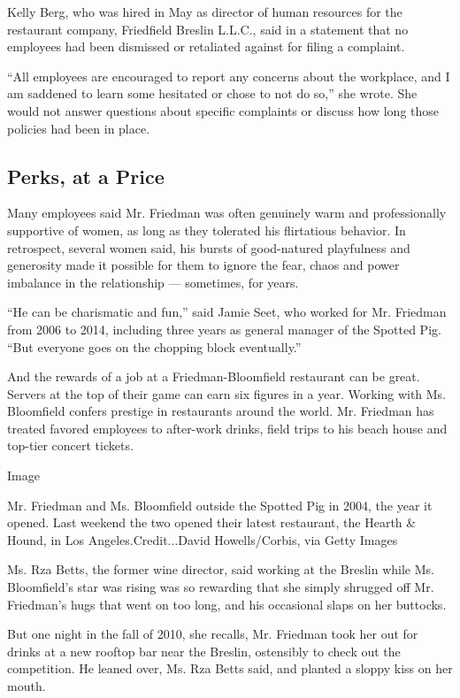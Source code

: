 Kelly Berg, who was hired in May as director of human resources for the
restaurant company, Friedfield Breslin L.L.C., said in a statement that
no employees had been dismissed or retaliated against for filing a
complaint.

``All employees are encouraged to report any concerns about the
workplace, and I am saddened to learn some hesitated or chose to not do
so,'' she wrote. She would not answer questions about specific
complaints or discuss how long those policies had been in place.

\hypertarget{perks-at-a-price}{%
\subsection{Perks, at a Price}\label{perks-at-a-price}}

Many employees said Mr. Friedman was often genuinely warm and
professionally supportive of women, as long as they tolerated his
flirtatious behavior. In retrospect, several women said, his bursts of
good-natured playfulness and generosity made it possible for them to
ignore the fear, chaos and power imbalance in the relationship ---
sometimes, for years.

``He can be charismatic and fun,'' said Jamie Seet, who worked for Mr.
Friedman from 2006 to 2014, including three years as general manager of
the Spotted Pig. ``But everyone goes on the chopping block eventually.''

And the rewards of a job at a Friedman-Bloomfield restaurant can be
great. Servers at the top of their game can earn six figures in a year.
Working with Ms. Bloomfield confers prestige in restaurants around the
world. Mr. Friedman has treated favored employees to after-work drinks,
field trips to his beach house and top-tier concert tickets.

Image

Mr. Friedman and Ms. Bloomfield outside the Spotted Pig in 2004, the
year it opened. Last weekend the two opened their latest restaurant, the
Hearth \& Hound, in Los Angeles.Credit...David Howells/Corbis, via Getty
Images

Ms. Rza Betts, the former wine director, said working at the Breslin
while Ms. Bloomfield's star was rising was so rewarding that she simply
shrugged off Mr. Friedman's hugs that went on too long, and his
occasional slaps on her buttocks.

But one night in the fall of 2010, she recalls, Mr. Friedman took her
out for drinks at a new rooftop bar near the Breslin, ostensibly to
check out the competition. He leaned over, Ms. Rza Betts said, and
planted a sloppy kiss on her mouth.

